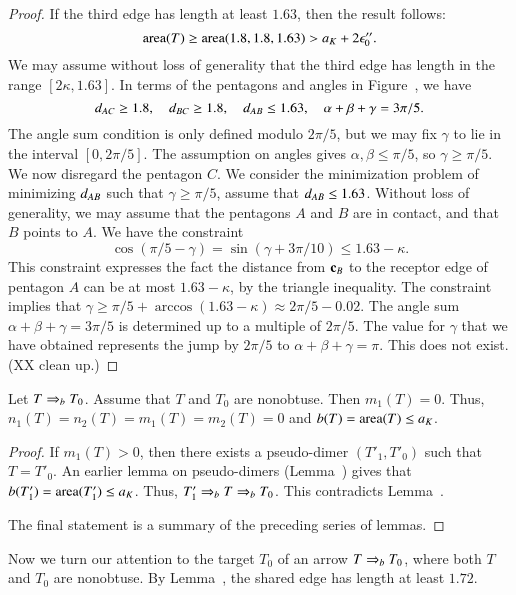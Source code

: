 \begin{proof}  If the third edge has length at least $1.63$, then the result follows:
\[
{\operatorname{area}}(T) \ge {\operatorname{area}}(1.8,1.8,1.63) > a_K + 2\epsilon_0''.
\]
We may assume without loss of generality that the third edge has length in the range $[2\kappa,1.63]$.
In terms of the pentagons and angles in Figure~, we have
\[
d_{AC}\ge 1.8,\quad d_{BC}\ge 1.8,\quad d_{AB}\le 1.63,\quad \alpha+\beta+\gamma=3\pi/5.
\]
The angle sum condition is only defined modulo $2\pi/5$, but we may fix $\gamma$ to lie in the
interval $[0,2\pi/5]$.
The assumption on angles gives $\alpha,\beta\le \pi/5$, so $\gamma\ge \pi/5$.
We now disregard the pentagon $C$.  We consider the minimization problem of minimizing $d_{AB}$ such that
$\gamma\ge\pi/5$, assume that $d_{AB}\le 1.63$.  Without loss of generality, we may assume that the
pentagons $A$ and $B$ are in contact, and that $B$ points to $A$.
We have the constraint
\[
\cos(\pi/5 - \gamma) =\sin(\gamma+3\pi/10) \le 1.63 - \kappa.
\]
This constraint expresses the fact the distance from ${\mathbf c}_B$ to the  receptor edge of pentagon $A$  can be at
most $1.63-\kappa$, by the triangle inequality.  The constraint implies that
$\gamma \ge \pi/5 + \arccos (1.63-\kappa) \approx 2\pi/5 - 0.02$.
The angle sum $\alpha+\beta+\gamma=3\pi/5$ is determined up to a multiple of $2\pi/5$.  The value
for $\gamma$ that we have obtained represents the jump by $2\pi/5$ to $\alpha+\beta+\gamma=\pi$.
This does not exist. (XX clean up.)

\end{proof}

\begin{lemma} Let $T\Rightarrow_{b} T_0$. Assume that $T$ and $T_0$ are nonobtuse.
Then $m_1(T)=0$.  Thus, $n_1(T)=n_2(T)=m_1(T)=m_2(T)=0$ and $b(T)={\operatorname{area}}(T)\le a_K$.
\end{lemma}

\begin{proof}
If $m_1(T)>0$, then there exists a pseudo-dimer $(T'_1,T'_0)$ such that $T=T'_0$.
An earlier lemma on pseudo-dimers (Lemma~) gives that $b(T'_1)={\operatorname{area}}(T'_1)\le a_K$.
Thus, $T'_1\Rightarrow_{b} T\Rightarrow_{b} T_0$.  This contradicts Lemma~.

The final statement is a summary of the preceding series of lemmas.
\end{proof}

Now we turn our attention to the target $T_0$ of an arrow $T\Rightarrow_{b} T_0$, where both
$T$ and $T_0$ are nonobtuse.  By Lemma~, the shared edge
has length at least $1.72$.

